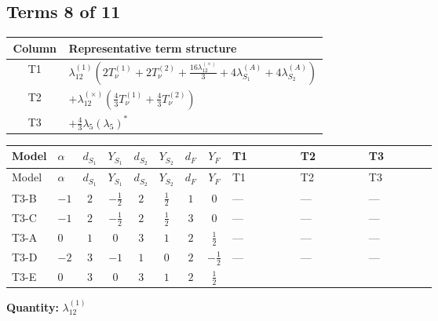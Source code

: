 \documentclass[8pt]{article}
\begin{document}
\begin{landscape}
\subsection*{Terms 8 of 11}
\begin{center}
\begin{tabular}{@{}c >{\raggedright\arraybackslash}p{0.82\linewidth}@{}}
\toprule
Column & Representative term structure \\
\midrule
T1 & \(\displaystyle {\lambda_{12}^{(1)}} \left(2 T_{\nu}^{(1)}+2 T_{\nu}^{(2)}+\frac{16 {\lambda_{12}^{(\times)}}}{3}+4 {\lambda_{S_1}^{(A)}}+4 {\lambda_{S_2}^{(A)}}\right)\) \\
\midrule
T2 & \(\displaystyle +{\lambda_{12}^{(\times)}} \left(\frac{4}{3} T_{\nu}^{(1)}+\frac{4}{3} T_{\nu}^{(2)}\right)\) \\
\midrule
T3 & \(\displaystyle +\frac{4}{3} {\lambda_5} \left({\lambda_5}\right)^{*}\) \\
\midrule
\bottomrule
\end{tabular}
\end{center}
\smallskip
\tiny
\begin{longtable}{@{}llcccccc >{\raggedright\arraybackslash}p{0.21\linewidth} >{\raggedright\arraybackslash}p{0.21\linewidth} >{\raggedright\arraybackslash}p{0.21\linewidth}@{}}
\toprule
Model & $\alpha$ & $d_{S_1}$ & $Y_{S_1}$ & $d_{S_2}$ & $Y_{S_2}$ & $d_F$ & $Y_F$ & T1 & T2 & T3 \\
\midrule
\endfirsthead
\toprule
Model & $\alpha$ & $d_{S_1}$ & $Y_{S_1}$ & $d_{S_2}$ & $Y_{S_2}$ & $d_F$ & $Y_F$ & T1 & T2 & T3 \\
\midrule
\endhead
T3-B & $-1$ & $2$ & $-\frac{1}{2}$ & $2$ & $\frac{1}{2}$ & $1$ & $0$ & --- & --- & --- \\
\midrule
T3-C & $-1$ & $2$ & $-\frac{1}{2}$ & $2$ & $\frac{1}{2}$ & $3$ & $0$ & --- & --- & --- \\
\midrule
T3-A & $0$ & $1$ & $0$ & $3$ & $1$ & $2$ & $\frac{1}{2}$ & --- & --- & --- \\
\midrule
T3-D & $-2$ & $3$ & $-1$ & $1$ & $0$ & $2$ & $-\frac{1}{2}$ & --- & --- & --- \\
\midrule
T3-E & $0$ & $3$ & $0$ & $3$ & $1$ & $2$ & $\frac{1}{2}$ & \scriptsize\adjustbox{max width=\linewidth}{$\begin{gathered} {\lambda_{12}^{(1)}} \left(2 T_{\nu}^{(1)}+2 T_{\nu}^{(2)}+\frac{16 {\lambda_{12}^{(\times)}}}{3}+4 {\lambda_{S_1}^{(A)}}+4 {\lambda_{S_2}^{(A)}}\right)\end{gathered}$} & \scriptsize\adjustbox{max width=\linewidth}{$\begin{gathered} +{\lambda_{12}^{(\times)}} \left(\frac{4}{3} T_{\nu}^{(1)}+\frac{4}{3} T_{\nu}^{(2)}\right)\end{gathered}$} & \scriptsize\adjustbox{max width=\linewidth}{$\begin{gathered} +\frac{4}{3} {\lambda_5} \left({\lambda_5}\right)^{*}\end{gathered}$} \\
\midrule
\bottomrule
\end{longtable}
\clearpage
\noindent\textbf{Quantity: }$\lambda_{12}^{(1)}$\par\smallskip

\end{landscape}
\end{document}
